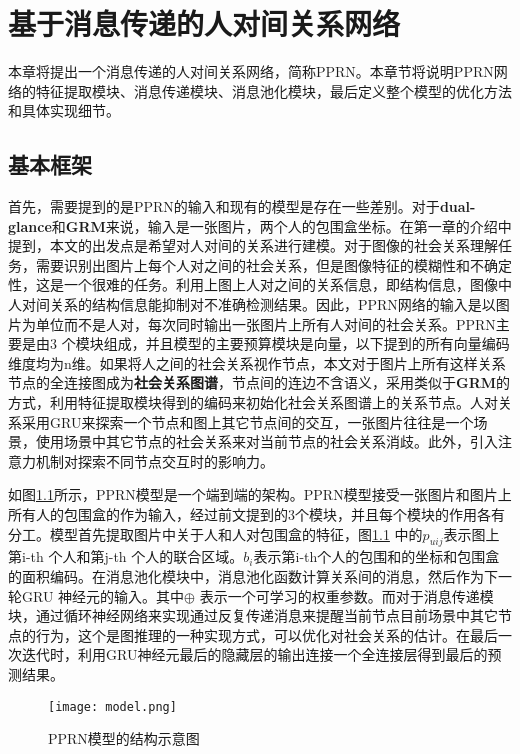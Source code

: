 
\chapter{基于消息传递的人对间关系网络}
\label{ch:model}

本章将提出一个消息传递的人对间关系网络，简称PPRN。本章节将说明PPRN网络的特征提取模块、消息传递模块、消息池化模块，最后定义整个模型的优化方法和具体实现细节。


\section{基本框架}
首先，需要提到的是PPRN的输入和现有的模型是存在一些差别。对于\textbf{dual-glance}和\textbf{GRM}来说，输入是一张图片，两个人的包围盒坐标。在第一章的介绍中提到，本文的出发点是希望对人对间的关系进行建模。对于图像的社会关系理解任务，需要识别出图片上每个人对之间的社会关系，但是图像特征的模糊性和不确定性，这是一个很难的任务。利用上图上人对之间的关系信息，即结构信息，图像中人对间关系的结构信息能抑制对不准确检测结果。因此，PPRN网络的输入是以图片为单位而不是人对，每次同时输出一张图片上所有人对间的社会关系。PPRN主要是由3 个模块组成，并且模型的主要预算模块是向量，以下提到的所有向量编码维度均为n维。如果将人之间的社会关系视作节点，本文对于图片上所有这样关系节点的全连接图成为\textbf{社会关系图谱}，节点间的连边不含语义，采用类似于\textbf{GRM}的方式，利用特征提取模块得到的编码来初始化社会关系图谱上的关系节点。人对关系采用GRU来探索一个节点和图上其它节点间的交互，一张图片往往是一个场景，使用场景中其它节点的社会关系来对当前节点的社会关系消歧。此外，引入注意力机制对探索不同节点交互时的影响力。

如图\ref{fig:model-pprn}所示，PPRN模型是一个端到端的架构。PPRN模型接受一张图片和图片上所有人的包围盒的作为输入，经过前文提到的3个模块，并且每个模块的作用各有分工。模型首先提取图片中关于人和人对包围盒的特征，图\ref{fig:model-pprn} 中的$p_{uij}$表示图上第i-th 个人和第j-th 个人的联合区域。$b_{i}$表示第i-th个人的包围和的坐标和包围盒的面积编码。在消息池化模块中，消息池化函数计算关系间的消息，然后作为下一轮GRU 神经元的输入。其中$\oplus$ 表示一个可学习的权重参数。而对于消息传递模块，通过循环神经网络来实现通过反复传递消息来提醒当前节点目前场景中其它节点的行为，这个是图推理的一种实现方式，可以优化对社会关系的估计。在最后一次迭代时，利用GRU神经元最后的隐藏层的输出连接一个全连接层得到最后的预测结果。
\begin{figure}[htpb]
	\centering
	\texttt{[image: model.png]}
    \caption{PPRN模型的结构示意图}
	\vspace*{-3.5mm}
	\label{fig:model-pprn}
\end{figure}

